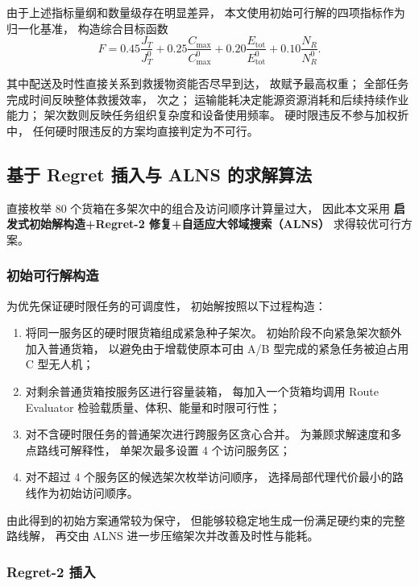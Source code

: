 由于上述指标量纲和数量级存在明显差异，
本文使用初始可行解的四项指标作为归一化基准，
构造综合目标函数
\begin{equation}
	F
	=
	0.45\frac{J_T}{J_T^0}
	+
	0.25\frac{C_{\max}}{C_{\max}^0}
	+
	0.20\frac{E_{\mathrm{tot}}}{E_{\mathrm{tot}}^0}
	+
	0.10\frac{N_R}{N_R^0}.
	\label{eq:q2-objective}
\end{equation}

其中配送及时性直接关系到救援物资能否尽早到达，
故赋予最高权重；
全部任务完成时间反映整体救援效率，
次之；
运输能耗决定能源资源消耗和后续持续作业能力；
架次数则反映任务组织复杂度和设备使用频率。
硬时限违反不参与加权折中，
任何硬时限违反的方案均直接判定为不可行。

\subsection{基于 Regret 插入与 ALNS 的求解算法}

直接枚举 80 个货箱在多架次中的组合及访问顺序计算量过大，
因此本文采用
\textbf{启发式初始解构造+Regret-2 修复+自适应大邻域搜索（ALNS）}
求得较优可行方案。

\subsubsection{初始可行解构造}

为优先保证硬时限任务的可调度性，
初始解按照以下过程构造：

\begin{enumerate}[label=\textbf{步骤\arabic*:},leftmargin=5em]
	\item 将同一服务区的硬时限货箱组成紧急种子架次。
	初始阶段不向紧急架次额外加入普通货箱，
	以避免由于增载使原本可由 A/B 型完成的紧急任务被迫占用 C 型无人机；
	\item 对剩余普通货箱按服务区进行容量装箱，
	每加入一个货箱均调用 Route Evaluator 检验载质量、体积、能量和时限可行性；
	\item 对不含硬时限任务的普通架次进行跨服务区贪心合并。
	为兼顾求解速度和多点路线可解释性，
	单架次最多设置 4 个访问服务区；
	\item 对不超过 4 个服务区的候选架次枚举访问顺序，
	选择局部代理代价最小的路线作为初始访问顺序。
\end{enumerate}

由此得到的初始方案通常较为保守，
但能够较稳定地生成一份满足硬约束的完整路线解，
再交由 ALNS 进一步压缩架次并改善及时性与能耗。

\subsubsection{Regret-2 插入}

